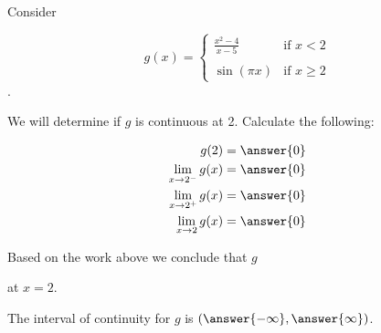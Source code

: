\documentclass{ximera}
\author{Nela Lakos \and Kyle Parsons}
\begin{document}
\begin{exercise}

Consider

\[
g(x) = 
\begin{cases}
\frac{x^2-4}{x-5} & \text{if }x<2\\ \\
\sin(\pi x) & \text{if }x\geq2
\end{cases}
\].

We will determine if $g$ is continuous at 2.  Calculate the following:

\begin{align*}
g(2) &= \answer{0}\\
\lim_{x\to2^-}g(x) &= \answer{0}\\
\lim_{x\to2^+}g(x) &= \answer{0}\\
\lim_{x\to2}g(x) &= \answer{0}
\end{align*}

\begin{exercise}

Based on the work above we conclude that $g$
\begin{multipleChoice}
\end{multipleChoice}
at $x=2$.

\begin{exercise}

The interval of continuity for $g$ is $\left(\answer{-\infty},\answer{\infty}\right)$.

\end{exercise}
\end{exercise}
\end{exercise}
\end{document}
